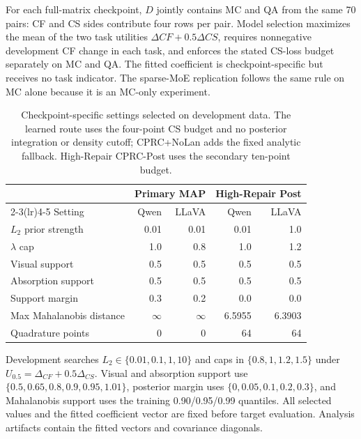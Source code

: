 \documentclass[letterpaper]{article}
\begin{document}
For each full-matrix checkpoint, $D$ jointly contains MC and QA from the same 70
pairs: CF and CS sides contribute four rows per pair. Model selection maximizes
the mean of the two task utilities $\Delta CF+0.5\Delta CS$, requires
nonnegative development CF change in each task, and enforces the stated CS-loss
budget separately on MC and QA. The fitted coefficient is checkpoint-specific
but receives no task indicator. The sparse-MoE replication follows the same
rule on MC alone because it is an MC-only experiment.

\begin{table}[t]
\centering
\small
\setlength{\tabcolsep}{2.2pt}
\begin{tabular}{lrrrr}
\toprule
& \multicolumn{2}{c}{Primary MAP} & \multicolumn{2}{c}{High-Repair Post} \\
\cmidrule(lr){2-3}\cmidrule(lr){4-5}
Setting & Qwen & LLaVA & Qwen & LLaVA \\
\midrule
$L_2$ prior strength & 0.01 & 0.01 & 0.01 & 1.0 \\
$\lambda$ cap & 1.0 & 0.8 & 1.0 & 1.2 \\
Visual support & 0.5 & 0.5 & 0.5 & 0.5 \\
Absorption support & 0.5 & 0.5 & 0.5 & 0.5 \\
Support margin & 0.3 & 0.2 & 0.0 & 0.0 \\
Max Mahalanobis distance & $\infty$ & $\infty$ & 6.5955 & 6.3903 \\
Quadrature points & 0 & 0 & 64 & 64 \\
\bottomrule
\end{tabular}
\caption{Checkpoint-specific settings selected on development data. The
learned route uses the four-point CS budget and no posterior integration or
density cutoff; CPRC+NoLan adds the fixed analytic fallback. High-Repair
CPRC-Post uses the secondary ten-point budget.}
\end{table}

Development searches $L_2\in\{0.01,0.1,1,10\}$ and caps in
$\{0.8,1,1.2,1.5\}$ under $U_{0.5}=\Delta_{CF}+0.5\Delta_{CS}$. Visual and
absorption support use $\{0.5,0.65,0.8,0.9,0.95,1.01\}$, posterior margin uses
$\{0,0.05,0.1,0.2,0.3\}$, and Mahalanobis support uses the training 0.90/0.95/0.99
quantiles. All selected values and the fitted coefficient vector are fixed
before target evaluation. Analysis artifacts contain the fitted vectors and
covariance diagonals.
\end{document}
